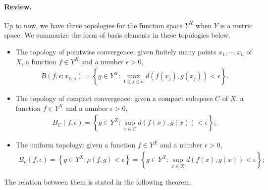 \documentclass{article}
\numberwithin{equation}{section}
\theoremstyle{plain}
\theoremstyle{definition}
\begin{document}
\paragraph{Review.} Up to now, we have three topologies for the function space $Y^X$ when $Y$ is a metric space. We summarize the form of basis elements in these topologies below.
\begin{itemize}
\item The topology of pointwise convergence: given finitely many points $x_1,\cdots,x_n$ of $X$, a function $f\in Y^X$ and a number $\epsilon > 0$,
\begin{align*}
	B(f,\epsilon;x_{1:n})=\left\{g\in Y^X:\max_{1\leq j\leq n} d\left(f(x_j),g(x_j)\right)<\epsilon\right\}.
\end{align*}
\item The topology of compact convergence: given a compact subspace $C$ of $X$, a function $f\in Y^X$ and a number $\epsilon > 0$,
\begin{align*}
	B_C(f,\epsilon)=\left\{g\in Y^X:\sup_{x\in C} d\left(f(x),g(x)\right)<\epsilon\right\};
\end{align*}
\item The uniform topology: given a function $f\in Y^X$ and a number $\epsilon>0$,
\begin{align*}
	B_\rho(f,\epsilon)=\left\{g\in Y^X: \rho\left(f,g\right)<\epsilon\right\}=\left\{g\in Y^X:\sup_{x\in X} d\left(f(x),g(x)\right)<\epsilon\right\};
\end{align*}
\end{itemize}
The relation between them is stated in the following theorem.
\end{document}
